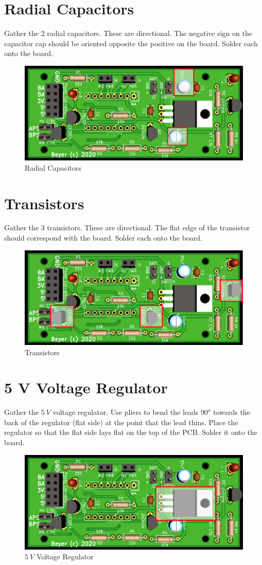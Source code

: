 \documentclass{handout}
\begin{document}
	\newpage
	\clearpage
	\pagebreak
	
	\section{Radial Capacitors}
	Gather the 2 radial capacitors. These are directional. The negative sign on the capacitor cap should be oriented opposite the positive on the board. Solder each onto the board.
	
	\begin{figure} [H]
	\centering
	\includegraphics[width=.5\textwidth]{radialcapacitors.png}
	\caption{Radial Capacitors}
	\end{figure}

	\section{Transistors}
	Gather the 3 transistors. These are directional. The flat edge of the transistor should correspond with the board. Solder each onto the board.
	
	\begin{figure} [H]
		\centering
		\includegraphics[width=.5\textwidth]{transistors.png}
		\caption{Transistors}
	\end{figure}
	
	\section{5 V Voltage Regulator}
	Gather the $5\ V$ voltage regulator. Use pliers to bend the leads $90^o$ towards the back of the regulator (flat side) at the point that the lead thins. Place the regulator so that the flat side lays flat on the top of the PCB. Solder it onto the board.
	
	\begin{figure} [H]
		\centering
		\includegraphics[width=.5\textwidth]{5vreg.png}
		\caption{$5\ V$ Voltage Regulator}
	\end{figure}
\end{document}
